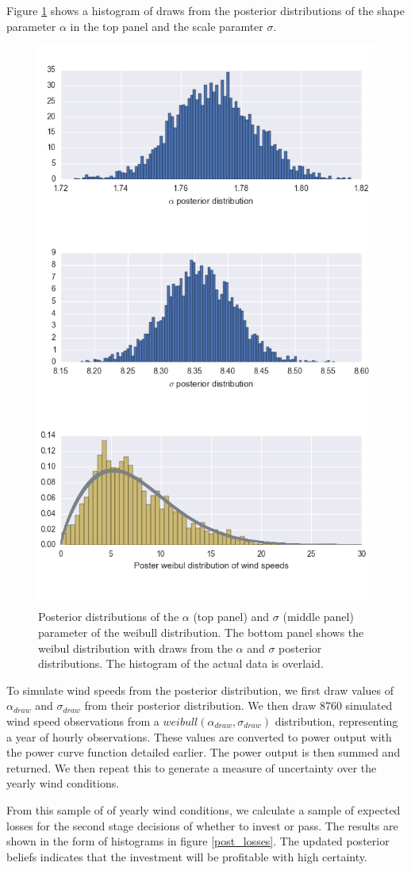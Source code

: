 \documentclass[11pt]{article}
\begin{document}
Figure \ref{posteriors} shows a histogram of draws from the posterior distributions of the shape parameter $\alpha$ in the top panel and the scale paramter $\sigma$.

\begin{figure}
	\centering
	\includegraphics[width=.6\textwidth]{figures/posteriors.png}
	\caption{Posterior distributions of the $\alpha$ (top panel) and $\sigma$ (middle panel) parameter of the weibull distribution. The bottom panel shows the weibul distribution with draws from the $\alpha$ and $\sigma$ posterior distributions. The histogram of the actual data is overlaid.}
	\label{posteriors}
\end{figure}

To simulate wind speeds from the posterior distribution, we first draw values of $\alpha_{draw}$ and $\sigma_{draw}$ from their posterior distribution. We then draw 8760 simulated wind speed observations from a $weibull(\alpha_{draw}, \sigma_{draw})$ distribution, representing a year of hourly observations. These values are converted to power output with the power curve function detailed earlier. The power output is then summed and returned. We then repeat this to generate a measure of uncertainty over the yearly wind conditions.

From this sample of of yearly wind conditions, we calculate a sample of expected losses for the second stage decisions of whether to invest or pass. The results are shown in the form of histograms in figure \ref{post_losses}. The updated posterior beliefs indicates that the investment will be profitable with high certainty. 
\end{document}
